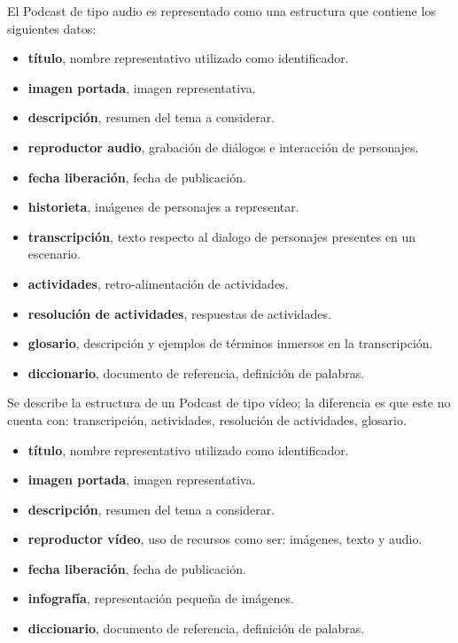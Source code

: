 El Podcast de tipo audio es representado como una estructura que contiene los
siguientes datos: 

\begin{itemize}

\item \textbf{título}, nombre representativo utilizado como identificador.
\item \textbf{imagen portada}, imagen representativa.
\item \textbf{descripción}, resumen del tema a considerar.
\item \textbf{reproductor audio}, grabación de diálogos e interacción de
personajes.
\item \textbf{fecha liberación}, fecha de publicación.
\item \textbf{historieta}, imágenes de personajes a representar.
\item \textbf{transcripción}, texto respecto al dialogo de personajes presentes en
un escenario.
\item \textbf{actividades}, retro-alimentación de actividades.
\item \textbf{resolución de actividades}, respuestas de actividades.
\item \textbf{glosario}, descripción y ejemplos de términos inmersos
en la transcripción.
\item \textbf{diccionario}, documento de referencia, definición de palabras. 

\end{itemize}

Se describe la estructura de un Podcast de tipo vídeo; la diferencia es que
este no cuenta con: transcripción, actividades, resolución de actividades,
glosario.

\begin{itemize}

\item \textbf{título}, nombre representativo utilizado como identificador.
\item \textbf{imagen portada}, imagen representativa.
\item \textbf{descripción}, resumen del tema a considerar.
\item \textbf{reproductor vídeo}, uso de recursos como ser: imágenes, texto y
audio.
\item \textbf{fecha liberación}, fecha de publicación.
\item \textbf{infografía}, representación pequeña de imágenes.
\item \textbf{diccionario}, documento de referencia, definición de palabras. 

\end{itemize}

